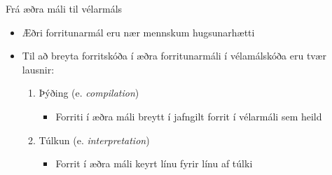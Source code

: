 \documentclass[handout]{beamer}
\begin{document}
\begin{frame}{Frá æðra máli til vélarmáls}
\begin{itemize}
 \item Æðri forritunarmál eru nær mennskum hugsunarhætti
 \item Til að breyta forritskóða í æðra forritunarmáli í vélamálskóða eru tvær lausnir:
 \begin{enumerate}
  \item Þýðing (e. \emph{compilation})
  \begin{itemize}
   \item Forriti í æðra máli breytt í jafngilt forrit í vélarmáli sem heild
  \end{itemize}
  \item Túlkun (e. \emph{interpretation})
  \begin{itemize}
   \item Forrit í æðra máli keyrt línu fyrir línu af túlki
  \end{itemize}
 \end{enumerate}
\end{itemize}
\end{frame}
\end{document}
